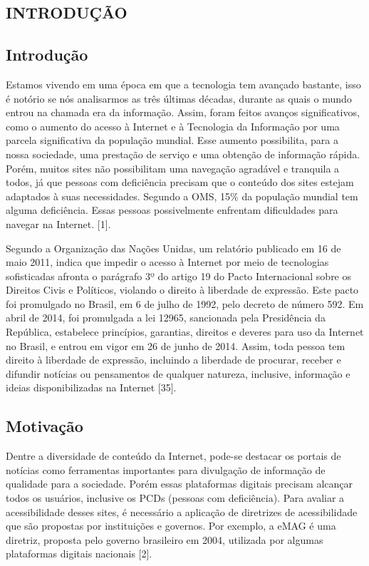 \documentclass[a4paper]{article}
\begin{document}
\begin{titlepage}
\section{INTRODUÇÃO}
\fontsize{12pt}{0pt}\selectfont
\onehalfspacing

\subsection{Introdução}

Estamos vivendo em uma época em que a tecnologia tem avançado bastante, isso é notório se nós analisarmos as três últimas décadas, durante as quais o mundo entrou na chamada era da informação. Assim, foram feitos avanços significativos, como o aumento do acesso à Internet e à Tecnologia da Informação por uma parcela significativa da população mundial. Esse aumento possibilita, para a nossa sociedade, uma prestação de serviço e uma obtenção de informação rápida. Porém, muitos sites não possibilitam uma navegação agradável e tranquila a todos, já que pessoas com deficiência precisam que o conteúdo dos sites estejam adaptados à suas necessidades. Segundo a OMS, 15\% da população mundial tem alguma deficiência. Essas pessoas possivelmente enfrentam dificuldades para navegar na Internet. [1].

Segundo a Organização das Nações Unidas, um relatório publicado em 16 de maio 2011, indica que impedir o acesso à Internet por meio de tecnologias sofisticadas afronta o  parágrafo 3º do artigo 19 do Pacto Internacional sobre os Direitos Civis e Políticos, violando o direito à liberdade de expressão. Este pacto foi promulgado no Brasil, em 6 de julho de 1992, pelo decreto de número 592. Em abril de 2014, foi promulgada a lei 12965, sancionada pela Presidência da República, estabelece princípios, garantias, direitos e deveres para uso da Internet no Brasil, e entrou em vigor em 26 de junho de 2014. Assim, toda pessoa tem direito à liberdade de expressão, incluindo a liberdade de procurar, receber e difundir notícias ou pensamentos de qualquer natureza, inclusive, informação e ideias disponibilizadas na Internet [35].

\subsection{Motivação}

Dentre a diversidade de conteúdo da Internet, pode-se destacar os portais de notícias como ferramentas importantes para divulgação de informação de qualidade para a sociedade. Porém essas plataformas digitais precisam alcançar todos os usuários, inclusive os PCDs (pessoas com deficiência). Para avaliar a acessibilidade desses sites, é necessário a aplicação de diretrizes de acessibilidade que são propostas por instituições e governos. Por exemplo, a eMAG é uma diretriz, proposta pelo governo brasileiro em 2004, utilizada por algumas plataformas digitais nacionais [2].


\end{titlepage}
\end{document}
